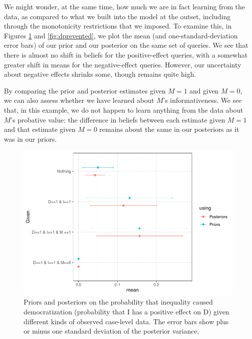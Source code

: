 \documentclass[
  12pt,
]{book}
\begin{document}
We might wonder, at the same time, how much we are in fact learning from the data, as compared to what we built into the model at the outset, including through the monotonicity restrictions that we imposed. To examine this, in Figures \ref{fig:dcaused} and \ref{fig:dprevented}, we plot the mean (and one-standard-deviation error bars) of our prior and our posterior on the same set of queries. We see that there is almost no shift in beliefs for the positive-effect queries, with a somewhat greater shift in means for the negative-effect queries. However, our uncertainty about negative effects shrinks some, though remains quite high.

By comparing the prior and posterior estimates given \(M=1\) and given \(M=0\), we can also assess whether we have learned about \(M\)'s informativeness. We see that, in this example, we do not happen to learn anything from the data about \(M\)'s probative value: the difference in beliefs between each estimate given \(M=1\) and that estimate given \(M=0\) remains about the same in our posteriors as it was in our priors.

\begin{figure}
\centering
\includegraphics{ii_files/figure-latex/dcaused-1.pdf}
\caption{\label{fig:dcaused}Priors and posteriors on the probability that inequality caused democratization (probability that I has a positive effect on D) given different kinds of observed case-level data. The error bars show plus or minus one standard deviation of the posterior variance.}
\end{figure}
\end{document}
